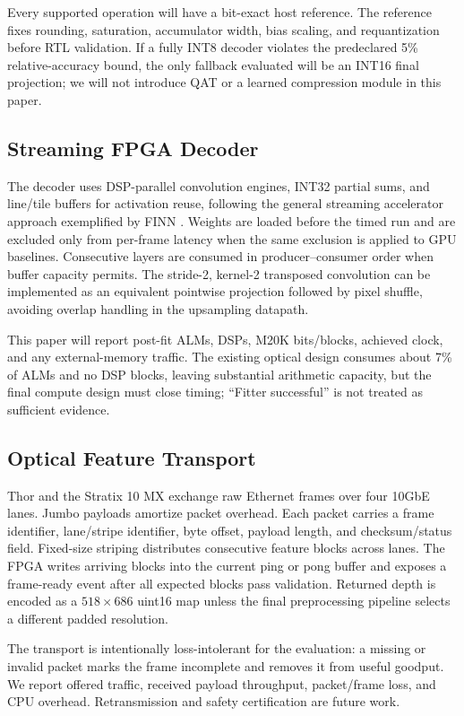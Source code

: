 \documentclass[sigconf]{support/acmart}
\begin{document}
Every supported operation will have a bit-exact host reference.  The reference
fixes rounding, saturation, accumulator width, bias scaling, and requantization
before RTL validation.  If a fully INT8 decoder violates the predeclared
5\% relative-accuracy bound, the only fallback evaluated will be an INT16 final
projection; we will not introduce QAT or a learned compression module in this
paper.

\subsection{Streaming FPGA Decoder}

The decoder uses DSP-parallel convolution engines, INT32 partial sums, and
line/tile buffers for activation reuse, following the general streaming
accelerator approach exemplified by FINN \cite{umuroglu2017finn}.  Weights are loaded before the timed
run and are excluded only from per-frame latency when the same exclusion is
applied to GPU baselines.  Consecutive layers are consumed in producer--consumer
order when buffer capacity permits.  The stride-2, kernel-2 transposed
convolution can be implemented as an equivalent pointwise projection followed
by pixel shuffle, avoiding overlap handling in the upsampling datapath.

This paper will report post-fit ALMs, DSPs, M20K bits/blocks, achieved clock,
and any external-memory traffic.  The existing optical design consumes about
7\% of ALMs and no DSP blocks, leaving substantial arithmetic capacity, but the
final compute design must close timing; ``Fitter successful'' is not treated as
sufficient evidence.

\subsection{Optical Feature Transport}

Thor and the Stratix 10 MX exchange raw Ethernet frames over four 10GbE lanes.
Jumbo payloads amortize packet overhead.  Each packet carries a frame identifier,
lane/stripe identifier, byte offset, payload length, and checksum/status field.
Fixed-size striping distributes consecutive feature blocks across lanes.  The
FPGA writes arriving blocks into the current ping or pong buffer and exposes a
frame-ready event after all expected blocks pass validation.  Returned depth is
encoded as a $518\times686$ uint16 map unless the final preprocessing pipeline
selects a different padded resolution.

The transport is intentionally loss-intolerant for the evaluation: a missing or
invalid packet marks the frame incomplete and removes it from useful goodput.
We report offered traffic, received payload throughput, packet/frame loss, and
CPU overhead.  Retransmission and safety certification are future work.
\end{document}
